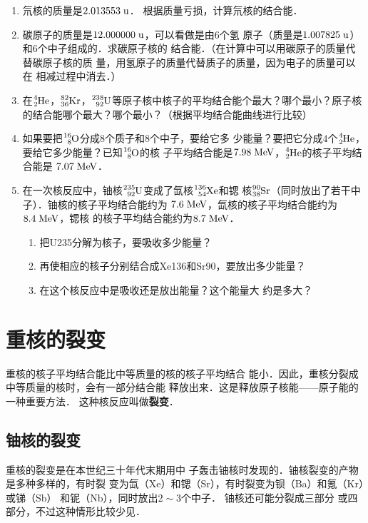 \begin{enumerate}
    \item 氘核的质量是$2.013553 \;\text{u}$．
    根据质量亏损，计算氘核的结合能．
    \item 碳原子的质量是$12.000000\;\text{u}$，可以看做是由6个氢
原子（质量是$1.007825\;\text{u}$）和6个中子组成的．求碳原子核的
结合能．（在计算中可以用碳原子的质量代替碳原子核的质
量，用氢原子的质量代替质子的质量，因为电子的质量可以在
相减过程中消去．）
\item  在$\atom{He}{4}{2}$，$\atom{Kr}{82}{36}$，$\atom{U}{238}{92}$等原子核中核子的平均结合能个最大？哪个最小？原子核的结合能哪个最大？哪个最小？（根据平均结合能曲线进行比较）
\item 如果要把$\atom{O}{16}{8}$分成8个质子和8个中子，要给它多
少能量？要把它分成$4$个$\atom{He}{4}{2}$，要给它多少能量？已知$\atom{O}{16}{8}$的核
子平均结合能是$7.98\;\text{MeV}$，$\atom{He}{4}{2}$的核子平均结合能是
$7.07\;\text{MeV}$．
\item 在一次核反应中，铀核$\atom{U}{235}{92}$变成了氙核$\atom{Xe}{136}{54}$和锶
核$\atom{Sr}{90}{38}$（同时放出了若干中子）．铀核的核子平均结合能约为
$7.6 \;\text{MeV}$，氙核的核子平均结合能约为$8.4 \;\text{MeV}$，锶核
的核子平均结合能约为$8.7 \;\text{MeV}$．
\begin{enumerate}
    \item 把U235分解为核子，要吸收多少能量？
    \item 再使相应的核子分别结合成Xe136和Sr90，要放出多少能量？
    \item 在这个核反应中是吸收还是放出能量？这个能量大
约是多大？
\end{enumerate}
\end{enumerate}


\section{重核的裂变}
重核的核子平均结合能比中等质量的核的核子平均结合
能小．因此，重核分裂成中等质量的核时，会有一部分结合能
释放出来．这是释放原子核能——原子能的一种重要方法．
这种核反应叫做\textbf{裂变}．

\subsection{铀核的裂变}

重核的裂变是在本世纪三十年代末期用中
子轰击铀核时发现的．铀核裂变的产物是多种多样的，有时裂
变为氙（Xe）和锶（Sr），有时裂变为钡（Ba）和氪（Kr）或锑（Sb）
和铌（Nb），同时放出$2 \sim 3$个中子．
铀核还可能分裂成三部分
或四部分，不过这种情形比较少见．

